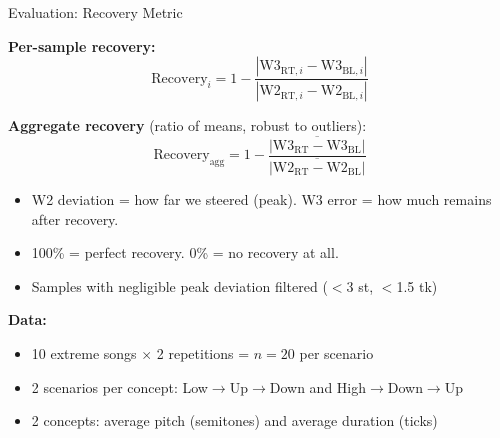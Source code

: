 \documentclass[aspectratio=169]{beamer}
\begin{document}
\begin{frame}{Evaluation: Recovery Metric}

\textbf{Per-sample recovery:}
\begin{equation*}
    \text{Recovery}_i = 1 - \frac{|\text{W3}_{\text{RT},i} - \text{W3}_{\text{BL},i}|}{|\text{W2}_{\text{RT},i} - \text{W2}_{\text{BL},i}|}
\end{equation*}

\textbf{Aggregate recovery} (ratio of means, robust to outliers):
\begin{equation*}
    \text{Recovery}_\text{agg} = 1 - \frac{\overline{|\text{W3}_{\text{RT}} - \text{W3}_{\text{BL}}|}}{\overline{|\text{W2}_{\text{RT}} - \text{W2}_{\text{BL}}|}}
\end{equation*}

\vspace{0.5em}

\begin{itemize}
    \item W2 deviation = how far we steered (peak). W3 error = how much remains after recovery.
    \item 100\% = perfect recovery. 0\% = no recovery at all.
    \item Samples with negligible peak deviation filtered ($<$3 st, $<$1.5 tk)
\end{itemize}

\vspace{1em}

\textbf{Data:}
\begin{itemize}
    \item 10 extreme songs $\times$ 2 repetitions = $n{=}20$ per scenario
    \item 2 scenarios per concept: Low$\to$Up$\to$Down and High$\to$Down$\to$Up
    \item 2 concepts: average pitch (semitones) and average duration (ticks)
\end{itemize}

\end{frame}
\end{document}
